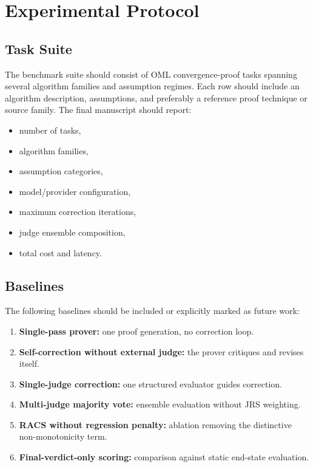 \documentclass[conference]{IEEEtran}
\begin{document}
\section{Experimental Protocol}
\label{sec:experiments}

\subsection{Task Suite}
The benchmark suite should consist of OML convergence-proof tasks spanning several algorithm families and assumption regimes. Each row should include an algorithm description, assumptions, and preferably a reference proof technique or source family. The final manuscript should report:
\begin{itemize}
    \item number of tasks,
    \item algorithm families,
    \item assumption categories,
    \item model/provider configuration,
    \item maximum correction iterations,
    \item judge ensemble composition,
    \item total cost and latency.
\end{itemize}

\subsection{Baselines}
The following baselines should be included or explicitly marked as future work:
\begin{enumerate}
    \item \textbf{Single-pass prover:} one proof generation, no correction loop.
    \item \textbf{Self-correction without external judge:} the prover critiques and revises itself.
    \item \textbf{Single-judge correction:} one structured evaluator guides correction.
    \item \textbf{Multi-judge majority vote:} ensemble evaluation without JRS weighting.
    \item \textbf{RACS without regression penalty:} ablation removing the distinctive non-monotonicity term.
    \item \textbf{Final-verdict-only scoring:} comparison against static end-state evaluation.
\end{enumerate}
\end{document}
